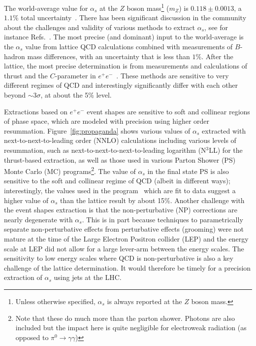 The world-average value for $\alpha_s$ at the $Z$ boson mass\footnote{Unless otherwise specified, $\alpha_s$ is always reported at the $Z$ boson mass. } ($m_Z$) is $0.118\pm 0.0013$, a $1.1\%$ total uncertainty~\cite{Olive:2016xmw}.  There has been significant discussion in the community about the challenges and validity of various methods to extract $\alpha_s$, see for instance Refs.~\cite{Bethke:2011tr,Pich:2013sqa,Moch:2014tta,dEnterria:2015kmd,Olive:2016xmw,Salam:2017qdl,Altarelli:2013bpa}.  The most precise (and dominant) input to the world-average is the $\alpha_s$ value from lattice QCD calculations combined with measurements of $B$-hadron mass differences, with an uncertainty that is less than $1\%$.   After the lattice, the most precise determination is from measurements and calculations of thrust and the $C$-parameter in $e^+e^-$~\cite{Abbate:2010xh,Hoang:2015hka,Heister:2003aj,Abdallah:2004xe,Abreu:1996mk,Abreu:1999rc,Biebel:1999zt,Adeva:1992gv,Abbiendi:2004qz,Abe:1994mf}.   These methods are sensitive to very different regimes of QCD and interestingly significantly differ with each other beyond $\sim 3\sigma$, at about the 5\% level.  



Extractions based on $e^+e^-$ event shapes are sensitive to soft and
collinear regions of phase space, which are modeled with precision
using higher order resummation.  Figure~\ref{fig:propaganda} shows
various values of $\alpha_s$ extracted with next-to-next-to-leading
order (NNLO) calculations including various levels of resummation, such as next-to-next-to-next-to-leading logarithm (N$^3$LL) for the thrust-based extraction, as well as those used in various Parton Shower
(PS) Monte Carlo (MC) programs\footnote{Note that these do much more
  than the parton shower.  Photons are also included but the impact
  here is quite negligible for electroweak radiation (as opposed to
  $\pi^0\rightarrow\gamma\gamma$)}.  The value of $\alpha_s$ in the
final state PS is also sensitive to the soft and collinear regime of
QCD (albeit in different ways); interestingly, the values used in the
\pythia program~\cite{Sjostrand:2006za,Sjostrand:2007gs} which are fit
to data suggest a higher value of $\alpha_s$ than the lattice result
by about 15\%.  Another challenge with the event shapes extraction is
that the non-perturbative (NP) corrections are nearly degenerate with
$\alpha_s$.  This is in part because techniques to parametrically
separate non-perturbative effects from perturbative effects (grooming)
were not mature at the time of the Large Electron Positron collider
(LEP) and the energy scale at LEP did not allow for a large lever-arm
between the energy scales.  The sensitivity to low energy scales where
QCD is non-perturbative is also a key challenge of the lattice
determination.  It would therefore be timely for a precision
extraction of $\alpha_s$ using jets at the LHC.

